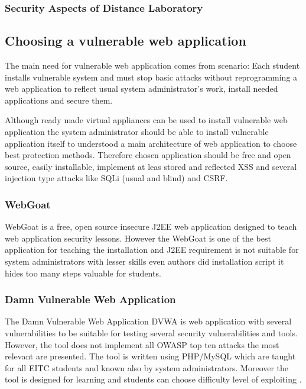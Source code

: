 \subsubsection{Security Aspects of Distance Laboratory}

\subsection{Choosing a vulnerable web application}

The main need for vulnerable web application comes from scenario: Each student installs vulnerable system and must stop basic attacks without reprogramming a web application to reflect usual system administrator's work,  install needed applications and secure them.

Although ready made virtual appliances can be used to install vulnerable web application the
system administrator should be able to install vulnerable application itself to understood a main architecture of web application to choose best protection methods. Therefore chosen application should be free and open source, easily installable, implement at leas stored and reflected \gls{XSS} and several injection type attacks like \gls{SQLi} (usual and blind) and \gls{CSRF}.

\subsubsection{WebGoat}
WebGoat is a free, open source insecure J2EE web application designed to teach web application security lessons.  However the WebGoat is one of the best application for teaching the installation and J2EE requirement is not suitable for system administrators with lesser skills even authors did installation script it hides too many steps valuable for students. 


\subsubsection{Damn Vulnerable Web Application}
The Damn Vulnerable Web Application \gls{DVWA} is web application with several vulnerabilities to be suitable for testing several security vulnerabilities and tools. However, the tool does not implement all \gls{OWASP} top ten attacks the most relevant are presented. The tool is written using PHP/MySQL which are taught for all \gls{EITC} students and known also by system administrators. Moreover the tool is designed for learning and students can choose difficulty level of exploiting \citep{website:dvwa}.

